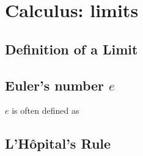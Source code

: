\section{Calculus: limits}

\subsection{Definition of a Limit}

\subsection[Euler's number \texorpdfstring{\(e\)}{e}]
           {Euler's number \boldmath\(e\)} \label{sec_e}

\(e\) is often defined as

\subsection{L'H\^opital's Rule}
